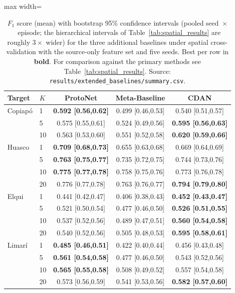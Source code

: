 \begin{table}[ht]
    \centering
    \caption{$F_1$ score (mean) with bootstrap 95\% confidence intervals (pooled seed~$\times$~episode; the hierarchical intervals of Table~\ref{tab:spatial_results} are roughly $3\times$ wider) for the three additional baselines under spatial cross-validation with the source-only feature set and five seeds. Best per row in \textbf{bold}. For comparison against the primary methods see Table~\ref{tab:spatial_results}. Source: \texttt{results/extended\_baselines/summary.csv}.}
    \label{tab:extended_baselines}
    \footnotesize
    \begin{adjustbox}{max width=\textwidth}
    \begin{tabular}{llccc}
        \toprule
        \textbf{Target} & \textbf{$K$} & \textbf{ProtoNet} & \textbf{Meta-Baseline} & \textbf{CDAN} \\
        \midrule
        Copiap\'o  & 1  & \textbf{0.592 [0.56,0.62]} & 0.499 [0.46,0.53] & 0.540 [0.51,0.57] \\
                   & 5  & 0.575 [0.55,0.61] & 0.524 [0.49,0.56] & \textbf{0.595 [0.56,0.63]} \\
                   & 10 & 0.563 [0.53,0.60] & 0.551 [0.52,0.58] & \textbf{0.620 [0.59,0.66]} \\
        \midrule
        Huasco     & 1  & \textbf{0.709 [0.68,0.73]} & 0.655 [0.63,0.68] & 0.669 [0.64,0.69] \\
                   & 5  & \textbf{0.763 [0.75,0.77]} & 0.735 [0.72,0.75] & 0.744 [0.73,0.76] \\
                   & 10 & \textbf{0.775 [0.77,0.78]} & 0.758 [0.75,0.76] & 0.773 [0.76,0.78] \\
                   & 20 & 0.776 [0.77,0.78] & 0.763 [0.76,0.77] & \textbf{0.794 [0.79,0.80]} \\
        \midrule
        Elqui      & 1  & 0.441 [0.42,0.47] & 0.406 [0.38,0.43] & \textbf{0.452 [0.43,0.47]} \\
                   & 5  & 0.521 [0.50,0.54] & 0.477 [0.46,0.50] & \textbf{0.526 [0.51,0.55]} \\
                   & 10 & 0.537 [0.52,0.56] & 0.489 [0.47,0.51] & \textbf{0.560 [0.54,0.58]} \\
                   & 20 & 0.540 [0.52,0.56] & 0.505 [0.48,0.53] & \textbf{0.595 [0.58,0.61]} \\
        \midrule
        Limar\'i   & 1  & \textbf{0.485 [0.46,0.51]} & 0.422 [0.40,0.44] & 0.456 [0.43,0.48] \\
                   & 5  & \textbf{0.561 [0.54,0.58]} & 0.477 [0.46,0.50] & 0.543 [0.52,0.56] \\
                   & 10 & \textbf{0.565 [0.55,0.58]} & 0.508 [0.49,0.52] & 0.557 [0.54,0.58] \\
                   & 20 & 0.573 [0.56,0.59] & 0.541 [0.53,0.56] & \textbf{0.582 [0.57,0.60]} \\
        \bottomrule
    \end{tabular}
    \end{adjustbox}
\end{table}
